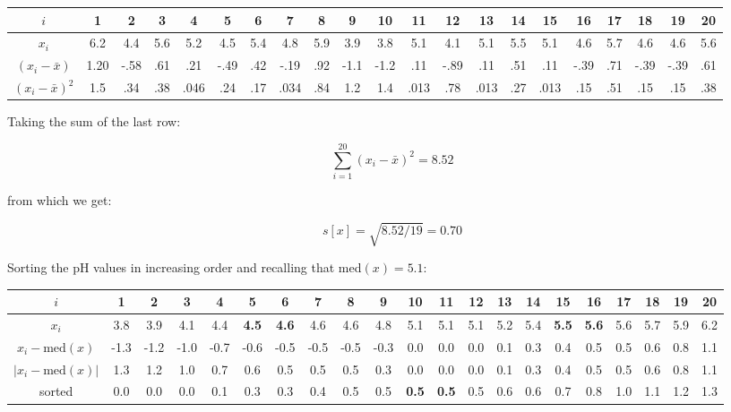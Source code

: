 \begin{center}
\begin{tabular}{c@{\tgap}|
    @{\tgap}c@{\gap}c@{\gap}c@{\gap}c@{\gap}c@{\tgap}
    @{\tgap}c@{\gap}c@{\gap}c@{\gap}c@{\gap}c@{\tgap}
    @{\tgap}c@{\gap}c@{\gap}c@{\gap}c@{\gap}c@{\tgap}
    @{\tgap}c@{\gap}c@{\gap}c@{\gap}c@{\gap}c@{\tgap}}
  $i$ & 1 & 2 & 3 & 4 & 5 & 6 & 7 & 8 & 9 & 10 &
  11 & 12 & 13 & 14 & 15 & 16 & 17 & 18 & 19 & 20 \\ \hline
  $x_i$ & 6.2 & 4.4 & 5.6 & 5.2 & 4.5 & 5.4 & 4.8 & 5.9 & 3.9 & 3.8 & 
  5.1 & 4.1 & 5.1 & 5.5 & 5.1 & 4.6 & 5.7 & 4.6 & 4.6 & 5.6 \\
  $(x_i-\bar{x})$ & 1.20 & -.58 & .61 & .21 & -.49 & .42 &
  -.19 & .92 & -1.1 & -1.2 & .11 & -.89 & .11 & .51 &
  .11 & -.39 & .71 & -.39 & -.39 & .61 \\
  $(x_i-\bar{x})^2$ & 1.5 & .34 & .38 & .046 & .24 & .17 &
  .034 & .84 & 1.2 & 1.4 & .013 & .78 & .013 & .27 & .013 &
  .15 & .51 & .15 & .15 & .38
\end{tabular}
\end{center}

Taking the sum of the last row:

\[
\sum\limits_{i=1}^{20} (x_i-\bar{x})^2 = 8.52
\]

\noindent from which we get:

\[
s[x] = \sqrt{8.52/19} = 0.70
\]

Sorting the pH values in increasing order and recalling that med$(x) = 5.1$:

\begin{center}
\begin{tabular}{c@{\tgap}|
    @{\tgap}c@{\gap}c@{\gap}c@{\gap}c@{\gap}c@{\tgap}|
    @{\tgap}c@{\gap}c@{\gap}c@{\gap}c@{\gap}c@{\tgap}|
    @{\tgap}c@{\gap}c@{\gap}c@{\gap}c@{\gap}c@{\tgap}|
    @{\tgap}c@{\gap}c@{\gap}c@{\gap}c@{\gap}c@{\tgap}} $i$ & 1 & 2 & 3
  & 4 & 5 & 6 & 7 & 8 & 9 & 10 & 11 & 12 & 13 & 14 & 15 & 16 & 17 & 18
  & 19 & 20 \\ \hline
  $x_i$ & 3.8 & 3.9 & 4.1 & 4.4 & \textbf{4.5} &
  \textbf{4.6} & 4.6 & 4.6 & 4.8 & 5.1 & 5.1 & 5.1 & 5.2 & 5.4 &
  \textbf{5.5} & \textbf{5.6} & 5.6 & 5.7 & 5.9 & 6.2 \\
  $x_i-\mbox{med}(x)$ & -1.3 & -1.2 & -1.0 & -0.7 & -0.6 & -0.5 &
  -0.5 & -0.5 & -0.3 & 0.0 & 0.0 & 0.0 & 0.1 & 0.3 & 0.4 & 0.5 & 0.5 &
  0.6 & 0.8 & 1.1 \\
  $|x_i-\mbox{med}(x)|$ & 1.3 & 1.2 & 1.0 & 0.7 &
  0.6 & 0.5 & 0.5 & 0.5 & 0.3 & 0.0 & 0.0 & 0.0 & 0.1 & 0.3 & 0.4 &
  0.5 & 0.5 & 0.6 & 0.8 & 1.1 \\
  sorted & 0.0 & 0.0 & 0.0 & 0.1 & 0.3
  & 0.3 & 0.4 & 0.5 & 0.5 & \textbf{0.5} & \textbf{0.5} & 0.5 & 0.6 &
  0.6 & 0.7 & 0.8 & 1.0 & 1.1 & 1.2 & 1.3
\end{tabular}
\end{center}

